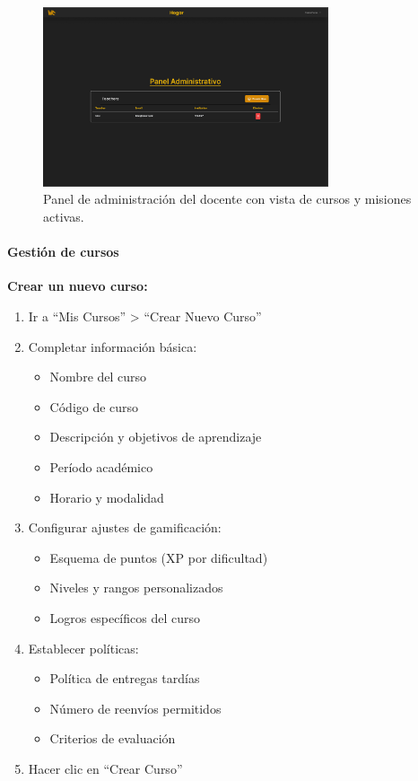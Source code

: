 \begin{figure}[H]
	\centering
	\includegraphics[width=0.75\textwidth]{images/pagina_web_panel-administrativo.png}
	\caption{Panel de administración del docente con vista de cursos y misiones activas.}
	\label{fig:manual-profesor}
\end{figure}

\paragraph{Gestión de cursos}

\textbf{Crear un nuevo curso:}

\begin{enumerate}
	\item Ir a ``Mis Cursos'' > ``Crear Nuevo Curso''
	\item Completar información básica:
	\begin{itemize}
		\item Nombre del curso
		\item Código de curso
		\item Descripción y objetivos de aprendizaje
		\item Período académico
		\item Horario y modalidad
	\end{itemize}
	\item Configurar ajustes de gamificación:
	\begin{itemize}
		\item Esquema de puntos (XP por dificultad)
		\item Niveles y rangos personalizados
		\item Logros específicos del curso
	\end{itemize}
	\item Establecer políticas:
	\begin{itemize}
		\item Política de entregas tardías
		\item Número de reenvíos permitidos
		\item Criterios de evaluación
	\end{itemize}
	\item Hacer clic en ``Crear Curso''
\end{enumerate}

